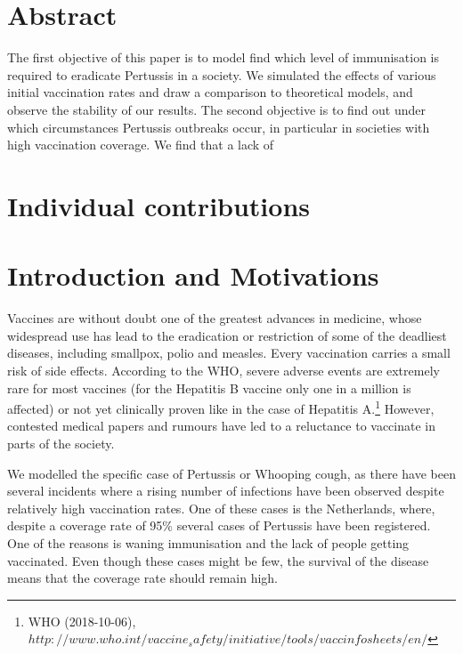 \documentclass[11pt]{article}
\begin{document}

\tableofcontents

\newpage




\section{Abstract}
The first objective of this paper is to model find which level of immunisation is required to eradicate Pertussis in a society. We simulated the effects of various initial vaccination rates and draw a comparison to theoretical models, and observe the stability of our results. 
The second objective is to find out under which circumstances Pertussis outbreaks occur, in particular in societies with high vaccination coverage. We find that a lack of  

\section{Individual contributions}

\section{Introduction and Motivations}

Vaccines are without doubt one of the greatest advances in medicine, whose widespread use has lead to the eradication or restriction of some of the deadliest diseases, including smallpox, polio and measles. Every vaccination carries a small risk of side effects. According to the WHO, severe adverse events are extremely rare for most vaccines (for the Hepatitis B vaccine only one in a million is affected) or not yet clinically proven like in the case of Hepatitis A.\footnote{WHO (2018-10-06), $http://www.who.int/vaccine_safety/initiative/tools/vaccinfosheets/en/$}  However, contested medical papers and rumours have led to a reluctance to vaccinate in parts of the society.

\vspace{14px}

We modelled the specific case of Pertussis or Whooping cough, as there have been several incidents where a rising number of infections have been observed despite relatively high vaccination rates. One of these cases is the Netherlands, where, despite a coverage rate of 95\% several cases of Pertussis have been registered. One of the reasons is waning immunisation and the lack of people getting vaccinated. Even though these cases might be few, the survival of the disease means that the coverage rate should remain high. 
\end{document}
